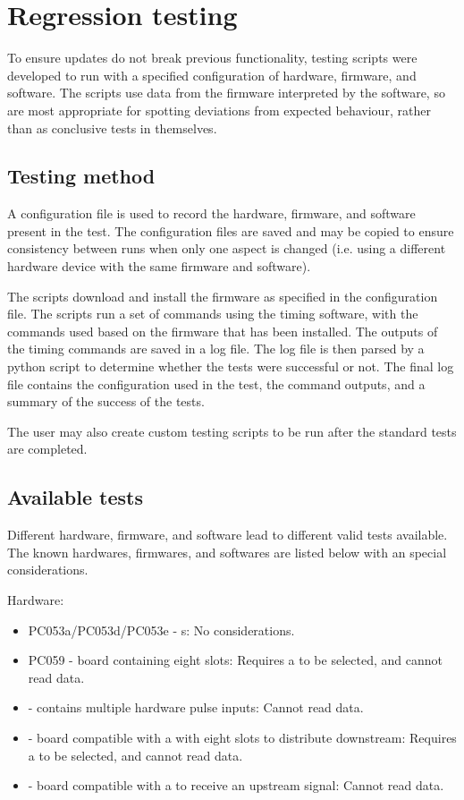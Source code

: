 \documentclass{dune}
\begin{document}
\section{Regression testing}
\label{sec:test-scripts}
To ensure updates do not break previous functionality, testing scripts were developed to run with a specified configuration of hardware, firmware, and software.
The scripts use data from the firmware interpreted by the software, so are most appropriate for spotting deviations from expected behaviour, rather than as conclusive tests in themselves.

\subsection{Testing method}
A configuration file is used to record the hardware, firmware, and software present in the test.
The configuration files are saved and may be copied to ensure consistency between runs when only one aspect is changed (i.e. using a different hardware device with the same firmware and software).

The scripts download and install the firmware as specified in the configuration file.
The scripts run a set of commands using the timing software, with the commands used based on the firmware that has been installed.
The outputs of the timing commands are saved in a log file.
The log file is then parsed by a python script to determine whether the tests were successful or not.
The final log file contains the configuration used in the test, the command outputs, and a summary of the success of the tests.

The user may also create custom testing scripts to be run after the standard tests are completed.

\subsection{Available tests}
Different hardware, firmware, and software lead to different valid tests available.
The known hardwares, firmwares, and softwares are listed below with an special considerations.

Hardware:
\begin{itemize}
    \item PC053a/PC053d/PC053e - s: No considerations.
    \item PC059 - board containing eight  slots: Requires a  to be selected, and cannot read  data.
    \item {} - contains multiple hardware pulse inputs: Cannot read  data.
    \item {} - board compatible with a  with eight  slots to distribute downstream: Requires a  to be selected, and cannot read  data.
    \item {} - board compatible with a  to receive an upstream signal: Cannot read  data.
\end{itemize}
\end{document}
